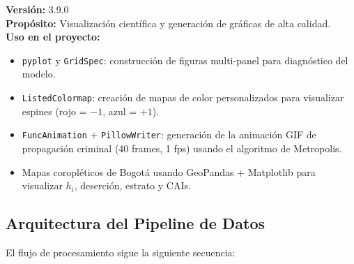 \documentclass[12pt,a4paper]{article}
\begin{document}
\textbf{Versión:} 3.9.0\\
\textbf{Propósito:} Visualización científica y generación de gráficas de alta calidad.\\
\textbf{Uso en el proyecto:}
\begin{itemize}
    \item \texttt{pyplot} y \texttt{GridSpec}: construcción de figuras multi-panel para diagnóstico del modelo.
    \item \texttt{ListedColormap}: creación de mapas de color personalizados para visualizar espines (rojo = $-1$, azul = $+1$).
    \item \texttt{FuncAnimation} + \texttt{PillowWriter}: generación de la animación GIF de propagación criminal (40 frames, 1 fps) usando el algoritmo de Metropolis.
    \item Mapas coropléticos de Bogotá usando GeoPandas + Matplotlib para visualizar $h_i$, deserción, estrato y CAIs.
\end{itemize}

\subsection{Arquitectura del Pipeline de Datos}

El flujo de procesamiento sigue la siguiente secuencia:
\end{document}
